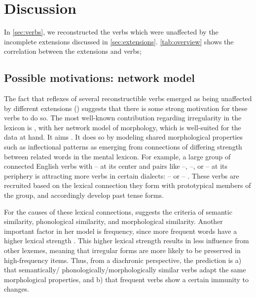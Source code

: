 \section{Discussion}
\label{sec:discussion}
In \cref{sec:verbs}, we reconstructed the verbs which were unaffected by the incomplete extensions discussed in \cref{sec:extensions}.
\cref{tab:overview} shows the correlation between the extensions and verbs; 



\subsection{Possible motivations: \texorpdfstring{}{Bybee's} network model}
\label{sec:motivations}
The fact that reflexes of several reconstructible verbs emerged as being unaffected by different extensions () suggests that there is some strong motivation for these verbs to do so.
The most well-known contribution regarding irregularity in the lexicon is \textcite{bybee1985morphology}, with her network model of morphology, which is well-suited for the data at hand.
It aims  \parencite[428]{bybee1995regular}.
It does so by modeling shared morphological properties such as inflectional patterns as emerging from connections of differing strength between related words in the mental lexicon.
For example, a large group of connected  English verbs with -- at its center and pairs like --, --, or -- at its periphery is attracting more verbs in certain dialects: -- or -- \parencite[129--130]{bybee1985morphology}.
These verbs are recruited based on the lexical connection they form with prototypical members of the group, and accordingly develop  past tense forms.

For the causes of these lexical connections, \textcite[118]{bybee1985morphology} suggests the criteria of semantic similarity, phonological similarity, and morphological similarity.
Another important factor in her model is frequency, since more frequent words have a higher lexical strength \parencite[119]{bybee1985morphology}.
This higher lexical strength results in less influence from other lexemes, meaning that irregular forms are more likely to be preserved in high-frequency items.
Thus, from a diachronic perspective, the prediction is a) that semantically\slash{} phonologically\slash\hspace{0pt}morphologically similar verbs adapt the same morphological properties, and b) that frequent verbs show a certain immunity to changes.

